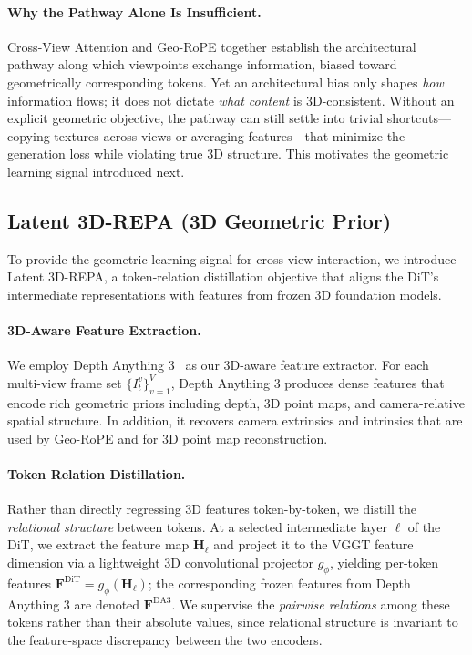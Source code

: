 \paragraph{Why the Pathway Alone Is Insufficient.}
Cross-View Attention and Geo-RoPE together establish the architectural pathway along which viewpoints exchange information, biased toward geometrically corresponding tokens. Yet an architectural bias only shapes \emph{how} information flows; it does not dictate \emph{what content} is 3D-consistent. Without an explicit geometric objective, the pathway can still settle into trivial shortcuts---copying textures across views or averaging features---that minimize the generation loss while violating true 3D structure. This motivates the geometric learning signal introduced next.

\subsection{Latent 3D-REPA (3D Geometric Prior)}
\label{sec:3d-repa}

To provide the geometric learning signal for cross-view interaction, we introduce Latent 3D-REPA, a token-relation distillation objective that aligns the DiT's intermediate representations with features from frozen 3D foundation models.

\paragraph{3D-Aware Feature Extraction.}
We employ Depth Anything 3~\cite{lin2025depthanything3} as our 3D-aware feature extractor. For each multi-view frame set $\{I_t^v\}_{v=1}^V$, Depth Anything 3 produces dense features that encode rich geometric priors including depth, 3D point maps, and camera-relative spatial structure. In addition, it recovers camera extrinsics and intrinsics that are used by Geo-RoPE and for 3D point map reconstruction.

\paragraph{Token Relation Distillation.}
Rather than directly regressing 3D features token-by-token, we distill the \emph{relational structure} between tokens. At a selected intermediate layer $\ell$ of the DiT, we extract the feature map $\mathbf{H}_\ell$ and project it to the VGGT feature dimension via a lightweight 3D convolutional projector $g_\phi$, yielding per-token features $\mathbf{F}^{\text{DiT}} = g_\phi(\mathbf{H}_\ell)$; the corresponding frozen features from Depth Anything 3 are denoted $\mathbf{F}^{\text{DA3}}$. We supervise the \emph{pairwise relations} among these tokens rather than their absolute values, since relational structure is invariant to the feature-space discrepancy between the two encoders.

